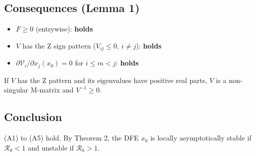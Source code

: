 \documentclass{article}
\begin{document}
\subsection*{Consequences (Lemma 1)}

\begin{itemize}
  \item $F \ge 0$ (entrywise): \textbf{holds}
  \item $V$ has the Z sign pattern ($V_{ij} \le 0$, $i \ne j$): \textbf{holds}
  \item $\partial \mathcal{V}_i / \partial x_j (x_0) = 0$ for $i \le m < j$: \textbf{holds}
\end{itemize}

If $V$ has the Z pattern and its eigenvalues have positive real parts, $V$ is a non-singular M-matrix and $V^{-1} \ge 0$.

\subsection*{Conclusion}

(A1) to (A5) hold. By Theorem 2, the DFE $x_0$ is locally asymptotically stable if $\mathcal{R}_0 < 1$ and unstable if $\mathcal{R}_0 > 1$.
\end{document}
